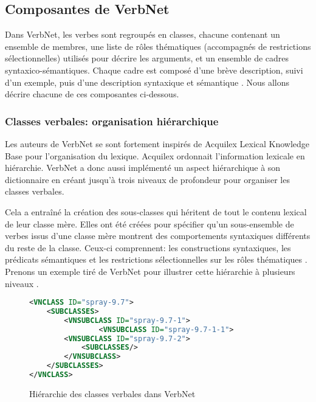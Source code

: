 \subsection {Composantes de VerbNet}

Dans VerbNet, les verbes sont regroupés en classes, chacune contenant un ensemble de membres, une liste de rôles thématiques (accompagnés de restrictions sélectionnelles) utilisés pour décrire les arguments, et un ensemble de cadres syntaxico-sémantiques. Chaque cadre est composé d'une brève description, suivi d'un exemple, puis d'une description syntaxique et sémantique \citep{SchulerVerbnetBroadcoverageComprehensive2005}. Nous allons décrire chacune de ces composantes ci-dessous.

\subsubsection{Classes verbales: organisation hiérarchique}\label{sec:vnarchitecture}

Les auteurs de VerbNet se sont fortement inspirés de Acquilex Lexical Knowledge Base \citep{CopestakeACQUILEXLKBrepresentation1992} pour l'organisation du lexique. Acquilex ordonnait l'information lexicale en hiérarchie. VerbNet a donc aussi implémenté un aspect hiérarchique à son dictionnaire en créant jusqu'à trois niveaux de profondeur pour organiser les classes verbales. 

Cela a entraîné la création des sous-classes qui héritent de tout le contenu lexical de leur classe mère. Elles ont été créées pour spécifier qu'un sous-ensemble de verbes issus d'une classe mère montrent des comportements syntaxiques différents du reste de la classe. Ceux-ci comprennent: les constructions syntaxiques, les prédicats sémantiques et les restrictions sélectionnelles sur les rôles thématiques \citep{SchulerVerbnetBroadcoverageComprehensive2005}. Prenons un exemple tiré de VerbNet pour illustrer cette hiérarchie à plusieurs niveaux \citep{CLEARVerbNetAnnotationGuidelines2005}.

\begin{figure}[htb]
  \caption{Hiérarchie des classes verbales dans VerbNet}
	\label{hierarch}
\begin{lstlisting}[language=XML]
<VNCLASS ID="spray-9.7">
    <SUBCLASSES>
        <VNSUBCLASS ID="spray-9.7-1">
                <VNSUBCLASS ID="spray-9.7-1-1">
        <VNSUBCLASS ID="spray-9.7-2">
            <SUBCLASSES/>
        </VNSUBCLASS>
    </SUBCLASSES>
</VNCLASS>
\end{lstlisting}
\end{figure}

